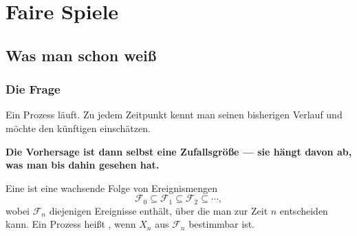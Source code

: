 \part{Faire Spiele}

\chapter{Was man schon weiß}

\section{Die Frage}

\begin{merksatz}
Ein Prozess läuft. Zu jedem Zeitpunkt kennt man seinen bisherigen Verlauf und möchte den künftigen einschätzen.

\begin{center}
\begin{minipage}{0.9\textwidth}
\textbf{Die Vorhersage ist dann selbst eine Zufallsgröße --- sie hängt davon ab, was man bis dahin gesehen hat.}
\end{minipage}
\end{center}

\begin{center}
\begin{minipage}{0.88\textwidth}
\end{minipage}
\end{center}
\end{merksatz}

\begin{definition}
Eine  ist eine wachsende Folge von Ereignismengen
\[ \mathcal F_0 \subseteq \mathcal F_1 \subseteq \mathcal F_2 \subseteq \cdots , \]
wobei $\mathcal F_n$ diejenigen Ereignisse enthält, über die man zur Zeit $n$ entscheiden kann. Ein Prozess heißt , wenn $X_n$ aus $\mathcal F_n$ bestimmbar ist.
\end{definition}

